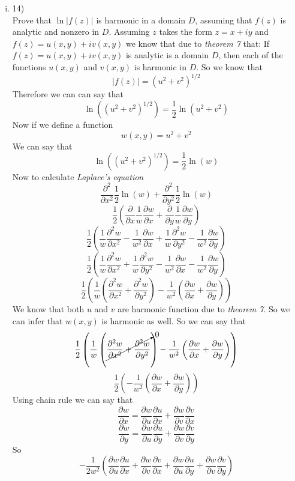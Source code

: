 \documentclass[11pt]{article}
\begin{document}
\begin{enumerate}
\begin{enumerate}[(i)]
\item 14)\\
Prove that $\ln|f(z)|$ is harmonic in a domain $D$, assuming that $f(z)$ is analytic and nonzero in $D$. Assuming $z$ takes the form $z=x+iy$ and $f(z) = u(x,y) +iv(x,y)$ we know that due to \emph{theorem 7} that: If $f(z) = u(x,y) +iv(x,y)$ is analytic is a domain $D$, then each of the functions $u(x,y)$ and $v(x,y)$ is harmonic in $D$. So we know that $$|f(z)| = (u^2+v^2)^{1/2}$$
Therefore we can can say that
$$\ln((u^2+v^2)^{1/2})= \frac{1}{2}\ln(u^2+v^2)$$
Now if we define a function $$w(x,y) = u^2+v^2$$
We can say that 
$$\ln((u^2+v^2)^{1/2})= \frac{1}{2}\ln(w)$$
Now to calculate \emph{Laplace's equation}
$$\frac{\partial^2}{\partial x^2}\frac{1}{2}\ln(w)+\frac{\partial^2}{\partial y^2}\frac{1}{2}\ln(w)$$
$$\frac{1}{2}\left(\frac{\partial}{\partial x}\frac{1}{w}\frac{\partial w}{\partial x}+\frac{\partial}{\partial y}\frac{1}{w}\frac{\partial w}{\partial y}\right)$$
$$\frac{1}{2}\left(\frac{1}{w}\frac{\partial^2 w}{\partial x^2}-\frac{1}{w^2}\frac{\partial w}{\partial x}+\frac{1}{w}\frac{\partial^2 w}{\partial y^2}-\frac{1}{w^2}\frac{\partial w}{\partial y}\right)$$
$$\frac{1}{2}\left(\frac{1}{w}\frac{\partial^2 w}{\partial x^2}+\frac{1}{w}\frac{\partial^2 w}{\partial y^2}-\frac{1}{w^2}\frac{\partial w}{\partial x}-\frac{1}{w^2}\frac{\partial w}{\partial y}\right)$$
$$\frac{1}{2}\left(\frac{1}{w}\left(\frac{\partial^2 w}{\partial x^2}+\frac{\partial^2 w}{\partial y^2}\right)-\frac{1}{w^2}\left(\frac{\partial w}{\partial x}+\frac{\partial w}{\partial y}\right)\right)$$
We know that both $u$ and $v$ are harmonic function due to \emph{theorem 7}. So we can infer that $w(x,y)$ is harmonic as well. So we can say that
$$\frac{1}{2}\left(\frac{1}{w}\left(\cancelto{0}{\frac{\partial^2 w}{\partial x^2}+\frac{\partial^2 w}{\partial y^2}}\right)-\frac{1}{w^2}\left(\frac{\partial w}{\partial x}+\frac{\partial w}{\partial y}\right)\right)$$
$$\frac{1}{2}\left(-\frac{1}{w^2}\left(\frac{\partial w}{\partial x}+\frac{\partial w}{\partial y}\right)\right)$$
Using chain rule we can say that 
$$\frac{\partial w}{\partial x} = \frac{\partial w}{\partial u}\frac{\partial u}{\partial x} +\frac{\partial w}{\partial v}\frac{\partial v}{\partial x}$$
$$\frac{\partial w}{\partial y} = \frac{\partial w}{\partial u}\frac{\partial u}{\partial y} +\frac{\partial w}{\partial v}\frac{\partial v}{\partial y}$$
So
$$-\frac{1}{2w^2}\left(\frac{\partial w}{\partial u}\frac{\partial u}{\partial x} +\frac{\partial w}{\partial v}\frac{\partial v}{\partial x}+\frac{\partial w}{\partial u}\frac{\partial u}{\partial y} +\frac{\partial w}{\partial v}\frac{\partial v}{\partial y}\right)$$

\end{enumerate}
\end{enumerate}
\end{document}
